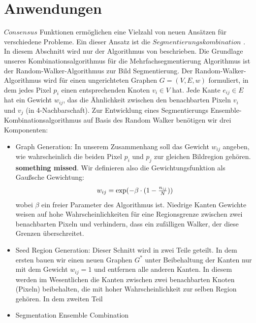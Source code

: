 \documentclass[runningheads]{llncs}
\begin{document}
\section{Anwendungen}
$Consensus$ Funktionen ermöglichen eine Vielzahl von neuen Ansätzen für
verschiedene Probleme. Ein dieser Ansatz ist die $Segmentierungskombination$ \cite{wattuya2008random}. In diesem Abschnitt wird nur der Algorithmus von \cite{wattuya2008random} beschrieben. Die Grundlage unseres Kombinationsalgorithmus für die Mehrfachsegmentierung
Algorithmus ist der Random-Walker-Algorithmus zur Bild
Segmentierung. Der Random-Walker-Algorithmus wird für einen
ungerichteten Graphen $G = (V, E, w)$ formuliert, in dem jedes Pixel
$p_i$ einen entsprechenden Knoten $v_i \in V$ hat. Jede Kante $e_{ij} \in E$  hat ein Gewicht $w_{ij}$, das die Ähnlichkeit zwischen den benachbarten Pixeln $v_i$ und $v_j$  (in 4-Nachbarschaft). Zur Entwicklung eines Segmentierungs
Ensemble-Kombinationsalgorithmus auf Basis des Random
Walker benötigen wir drei Komponenten:
\begin{itemize}
	\item Graph Generation: In unserem Zusammenhang soll das Gewicht $w_{ij}$ angeben, wie
	wahrscheinlich die beiden Pixel $p_i$ und $p_j$ zur gleichen
	Bildregion gehören.  \textbf{something missed}. Wir definieren also die Gewichtungsfunktion als Gaußsche Gewichtung:
	\begin{equation}
		\centerline{$w_{ij} = \exp(-\beta \cdot (1- \frac{n_{ij}}{N}))$}
	\end{equation} 
	wobei $\beta$ ein freier Parameter des Algorithmus ist. Niedrige Kanten
	Gewichte weisen auf hohe Wahrscheinlichkeiten für eine Regionsgrenze
	zwischen zwei benachbarten Pixeln und verhindern, dass ein
	zufälligen Walker, der diese Grenzen überschreitet.
	\item Seed Region Generation: Dieser Schnitt wird in zwei Teile geteilt. In dem ersten bauen wir einen neuen Graphen $G^*$ unter Beibehaltung der Kanten nur  mit dem Gewicht $w_{ij} = 1$ und entfernen alle anderen Kanten. In diesem
	werden im Wesentlichen die Kanten zwischen zwei benachbarten Knoten (Pixeln) beibehalten, die mit hoher Wahrscheinlichkeit zur selben Region gehören. In dem zweiten Teil 
	\item Segmentation Ensemble Combination
\end{itemize}
\printbibliography
\end{document}
